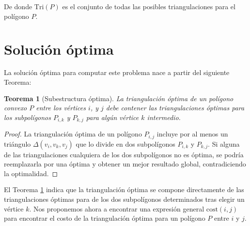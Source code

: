 \documentclass[tiny]{corsage}
\newcommand{\Tri}{\text{Tri}}
\newcommand{\cost}[1]{\text{cost}(#1)}
\theoremstyle{plain}
\newtheorem{theorem}{Teorema}
\theoremstyle{definition}
\begin{document}
	De donde $\Tri(P)$ es el conjunto de todas las posibles triangulaciones para el polígono $P$.

\section{Solución óptima}
	La solución óptima para computar este problema nace a partir del siguiente Teorema:

	\begin{theorem}[Subestructura óptima]
		La triangulación óptima de un polígono convexo $P$ entre los vértices $i$, y $j$ debe contener las triangulaciones óptimas para los subpolígonos $P_{i,k}$ y $P_{k,j}$ para algún vértice $k$ intermedio.
		\label{thm-opt}
	\end{theorem}

	\begin{proof}
		La triangulación óptima de un polígono $P_{i,j}$ incluye por al menos un triángulo $\Delta(v_i, v_k, v_j)$ que lo divide en dos subpolígonos $P_{i,k}$ y $P_{k,j}$.  Si alguna de las triangulaciones cualquiera de los dos subpolígonos no es óptima, se podría reemplazarla por una óptima y obtener un mejor resultado global, contradiciendo la optimalidad.
	\end{proof}

	El Teorema \ref{thm-opt} indica que la triangulación óptima se compone directamente de las triangulaciones óptimas para de los dos subpolígonos determinados tras elegir un vértice $k$.  Nos proponemos ahora a encontrar una expresión general $\cost{i, j}$ para encontrar el costo de la triangulación óptima para un polígono $P$ entre $i$ y $j$.
\end{document}
